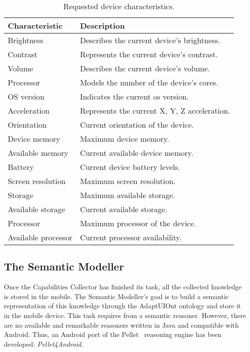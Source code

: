 \begin{table}[H]
  \caption{Requested device characteristics.}
 \label{tbl:device_characteristics}
\footnotesize
\centering
 \begin{tabular}{l l}
  \hline 
  \textbf{Characteristic}& \textbf{Description}				\\
  \hline
  Brightness		& Describes the current device’s brightness.	\\
  Contrast		& Represents the current device’s contrast.	\\
  Volume		& Describes the current device’s volume.	\\
  Processor		& Models the number of the device’s cores.	\\
  OS version		& Indicates the current	\ac{os} version.	\\
  Acceleration		& Represents the current X, Y, Z acceleration.	\\
  Orientation		& Current orientation of the device.		\\
  Device memory		& Maximum device memory.			\\
  Available memory	& Current available device memory.		\\
  Battery		& Current device battery levels.		\\
  Screen resolution	& Maximum screen resolution.			\\
  Storage		& Maximum available storage.			\\
  Available storage	& Current available storage.			\\
  Processor		& Maximum processor of the device.		\\
  Available processor	& Current processor availability.		\\
  \hline
\end{tabular}
\end{table}


\subsection{The Semantic Modeller}
\label{sec:semantic_modeller}

Once the Capabilities Collector has finished its task, all the collected
knowledge is stored in the mobile. The Semantic Modeller's goal is to build a 
semantic representation of this knowledge through the AdaptUIOnt ontology and
store it in the mobile device. This task requires from a semantic reasoner. 
However, there are no available and remarkable reasoners written in Java and 
compatible with Android. Thus, an Android port of the 
Pellet~\citep{pellet} reasoning engine has been developed: \textit{Pellet4Android}.


